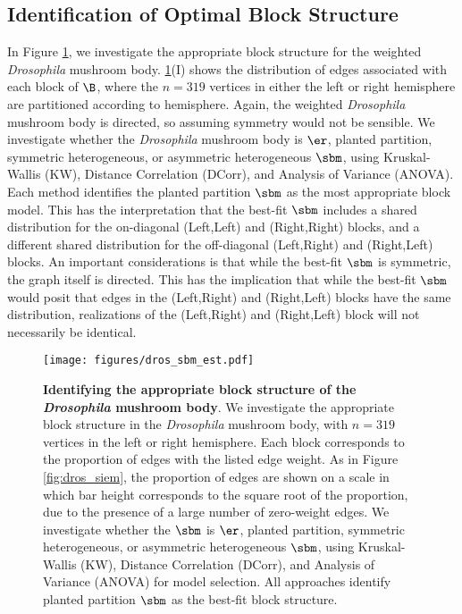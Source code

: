\subsection{Identification of Optimal Block Structure}\label{sec:sbm_est_wt}

In Figure \ref{fig:dros_sbm_est}, we investigate the appropriate block structure for the weighted \textit{Drosophila} mushroom body. \ref{fig:dros_sbm_est}(I) shows the distribution of edges associated with each block of $\B$, where the $n=319$ vertices in either the left or right hemisphere are partitioned according to hemisphere. Again, the weighted \textit{Drosophila} mushroom body is directed, so assuming symmetry would not be sensible. We investigate whether the \textit{Drosophila} mushroom body is $\er$, planted partition, symmetric heterogeneous, or asymmetric heterogeneous $\sbm$, using Kruskal-Wallis (KW), Distance Correlation (DCorr), and Analysis of Variance (ANOVA). Each method identifies the planted partition $\sbm$ as the most appropriate block model. This has the interpretation that the best-fit $\sbm$ includes a shared distribution for the on-diagonal (Left,Left) and (Right,Right) blocks, and a different shared distribution for the off-diagonal (Left,Right) and (Right,Left) blocks. An important considerations is that while the best-fit $\sbm$ is symmetric, the graph itself is directed. This has the implication that while the best-fit $\sbm$ would posit that edges in the (Left,Right) and (Right,Left) blocks have the same distribution, realizations of the (Left,Right) and (Right,Left) block will not necessarily be identical.

\begin{figure}
    \centering
    \texttt{[image: figures/dros\_sbm\_est.pdf]}
    \caption{\textbf{Identifying the appropriate block structure of the \textit{Drosophila} mushroom body}. We investigate the appropriate block structure in the \textit{Drosophila}  mushroom body, with $n=319$ vertices in the left or right hemisphere. Each block corresponds to the proportion of edges with the listed edge weight. As in Figure \ref{fig:dros_siem}, the proportion of edges are shown on a scale in which bar height corresponds to the square root of the proportion, due to the presence of a large number of zero-weight edges. We investigate whether the $\sbm$ is $\er$, planted partition, symmetric heterogeneous, or asymmetric heterogeneous $\sbm$, using Kruskal-Wallis (KW), Distance Correlation (DCorr), and Analysis of Variance (ANOVA) for model selection. All approaches identify planted partition $\sbm$ as the best-fit block structure.}
    \label{fig:dros_sbm_est}
\end{figure}

